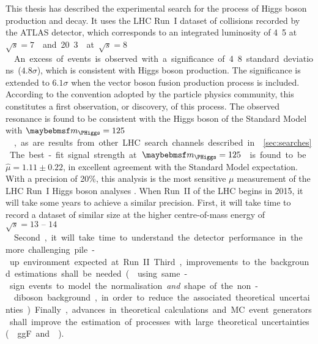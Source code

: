 
This thesis has described the experimental search for the \ggHWWlvlv process of Higgs boson 
production and decay. It uses the LHC Run~I dataset of \pp collisions recorded by the ATLAS 
detector, which corresponds to an integrated luminosity of \unit{4.5}{\invfb} at 
\unit{$\sqrt{s} = 7$}{\TeV} and \unit{20.3}{\invfb} at \unit{$\sqrt{s} = 8$}{\TeV}. 
An excess of events is observed with a significance of 4.8 standard deviations ($4.8\sigma$), 
which is consistent with Higgs boson production. The significance is extended to $6.1\sigma$ 
when the vector boson fusion production process is included. According to the convention 
adopted by the particle physics community, this constitutes a first observation, or 
discovery, of this process. The observed resonance is found to be consistent with the Higgs 
boson of the Standard Model with \unit{$\mH = 125$}{\GeV}, as are results from other LHC 
search channels described in \Section~\ref{sec:searches}.

The best-fit signal strength at \unit{$\mH = 125$}{\GeV} is found to be 
$\hat{\mu} = 1.11 \pm 0.22$, in excellent agreement with the Standard Model expectation. With 
a precision of 20\%, this \HWW analysis is the most sensitive $\mu$ measurement of the LHC 
Run~I Higgs boson analyses \cite{ATLAS:Hgg:RunI,ATLAS:HZZ:RunI,CMS:Hgamgam,CMS:HZZ,CMS:HWW}. 
When Run~II of the LHC begins in 2015, it will take some years to achieve a similar precision.
First, it will take time to record a dataset of similar size at the higher centre-of-mass 
energy of \unit{$\sqrt{s} = 13\text{ -- }14$}{\TeV}. Second, it will take time to understand 
the detector performance in the more challenging pile-up environment expected at Run~II. 
Third, improvements to the background estimations shall be needed (\eg using same-sign events 
to model the normalisation \textit{and} shape of the non-\WW diboson background, in order to 
reduce the associated theoretical uncertainties). Finally, advances in theoretical 
calculations and MC event generators shall improve the estimation of processes with large 
theoretical uncertainties (\eg ggF and \WW).
